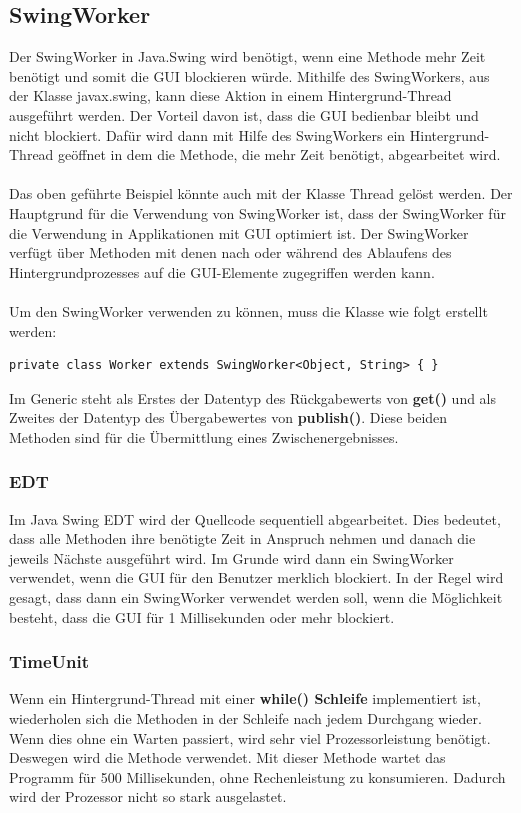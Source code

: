 \subsection{SwingWorker}
Der SwingWorker in Java.Swing wird benötigt, wenn eine Methode mehr Zeit benötigt und somit die \ac{GUI} blockieren würde. Mithilfe des SwingWorkers, aus der Klasse javax.swing, kann diese Aktion in einem Hintergrund-Thread ausgeführt werden. Der Vorteil davon ist, dass die \ac{GUI} bedienbar bleibt und nicht blockiert. Dafür wird dann mit Hilfe des SwingWorkers ein Hintergrund-Thread geöffnet in dem die Methode, die mehr Zeit benötigt, abgearbeitet wird.
\\ \\
Das oben geführte Beispiel könnte auch mit der Klasse Thread gelöst werden. Der Hauptgrund für die Verwendung von SwingWorker ist, dass der SwingWorker für die Verwendung in Applikationen mit \ac{GUI} optimiert ist. Der SwingWorker verfügt über Methoden mit denen nach oder während des Ablaufens des Hintergrundprozesses auf die \ac{GUI}-Elemente zugegriffen werden kann.
\\ \\ 
Um den SwingWorker verwenden zu können, muss die Klasse wie folgt erstellt werden:
\begin{lstlisting}[style=JavaStyle, caption=SwingWorker Klasse erstellen]
	private class Worker extends SwingWorker<Object, String> { } 
\end{lstlisting}
Im Generic steht als Erstes der Datentyp des Rückgabewerts von \textbf{get()} und als Zweites der Datentyp des Übergabewertes von \textbf{publish()}. Diese beiden Methoden sind für die Übermittlung eines Zwischenergebnisses.

\newpage

\subsubsection{EDT}
Im Java Swing \ac{EDT} wird der Quellcode sequentiell abgearbeitet. Dies bedeutet, dass alle Methoden ihre benötigte Zeit in Anspruch nehmen und danach die jeweils Nächste ausgeführt wird. Im Grunde wird dann ein SwingWorker verwendet, wenn die \ac{GUI} für den Benutzer merklich blockiert. In der Regel wird gesagt, dass dann ein SwingWorker verwendet werden soll, wenn die Möglichkeit besteht, dass die \ac{GUI} für 1 Millisekunden oder mehr blockiert.

\subsubsection{TimeUnit}
Wenn ein Hintergrund-Thread mit einer \textbf{while() Schleife} implementiert ist, wiederholen sich die Methoden in der Schleife nach jedem Durchgang wieder. Wenn dies ohne ein Warten passiert, wird sehr viel Prozessorleistung benötigt. \\ Deswegen wird die Methode  verwendet. Mit dieser Methode wartet das Programm für 500 Millisekunden, ohne Rechenleistung zu konsumieren. Dadurch wird der Prozessor nicht so stark ausgelastet. 

